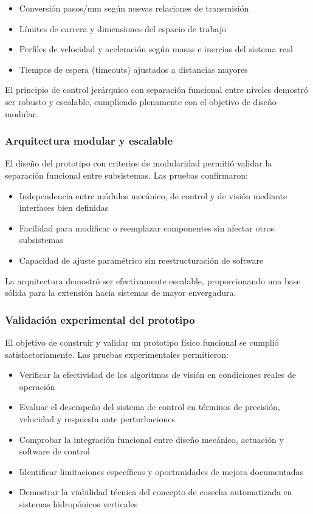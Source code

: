 \begin{itemize}
    \item Conversión pasos/mm según nuevas relaciones de transmisión
    \item Límites de carrera y dimensiones del espacio de trabajo
    \item Perfiles de velocidad y aceleración según masas e inercias del sistema real
    \item Tiempos de espera (timeouts) ajustados a distancias mayores
\end{itemize}

El principio de control jerárquico con separación funcional entre niveles demostró ser robusto y escalable, cumpliendo plenamente con el objetivo de diseño modular.

\subsubsection{Arquitectura modular y escalable}

El diseño del prototipo con criterios de modularidad permitió validar la separación funcional entre subsistemas. Las pruebas confirmaron:

\begin{itemize}
    \item Independencia entre módulos mecánico, de control y de visión mediante interfaces bien definidas
    \item Facilidad para modificar o reemplazar componentes sin afectar otros subsistemas
    \item Capacidad de ajuste paramétrico sin reestructuración de software
\end{itemize}

La arquitectura demostró ser efectivamente escalable, proporcionando una base sólida para la extensión hacia sistemas de mayor envergadura.

\subsubsection{Validación experimental del prototipo}

El objetivo de construir y validar un prototipo físico funcional se cumplió satisfactoriamente. Las pruebas experimentales permitieron:

\begin{itemize}
    \item Verificar la efectividad de los algoritmos de visión en condiciones reales de operación
    \item Evaluar el desempeño del sistema de control en términos de precisión, velocidad y respuesta ante perturbaciones
    \item Comprobar la integración funcional entre diseño mecánico, actuación y software de control
    \item Identificar limitaciones específicas y oportunidades de mejora documentadas
    \item Demostrar la viabilidad técnica del concepto de cosecha automatizada en sistemas hidropónicos verticales
\end{itemize}

